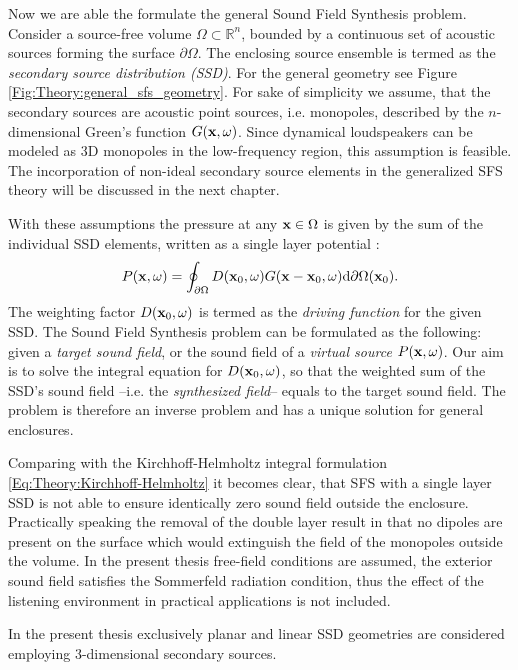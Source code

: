 Now we are able the formulate the general Sound Field Synthesis problem. Consider a source-free volume $\Omega \subset \mathbb{R}^n$, bounded by a continuous set of acoustic sources forming the surface $\partial \Omega$.
The enclosing source ensemble is termed as the \emph{secondary source distribution (SSD)}.
For the general geometry see Figure \ref{Fig:Theory:general_sfs_geometry}.
For sake of simplicity we assume, that the secondary sources are acoustic point sources, i.e. monopoles, described by the $n$-dimensional Green's function $G(\mathbf{x},\omega)$. Since dynamical loudspeakers can be modeled as 3D monopoles in the low-frequency region, this assumption is feasible. The incorporation of non-ideal secondary source elements in the generalized SFS theory will be discussed in the next chapter.

With these assumptions the pressure at any $\mathbf{x} \in \Omega$ is given by the sum of the individual SSD elements, written as a single layer potential \cite{Ahrens2012,Ahrens2010phd,Wierstorf2014,Schultz2014:Comparing_approaches}:
\begin{equation}
P(\mathbf{x},\omega) = \oint_{\partial \Omega} D(\mathbf{x}_0,\omega) G(\mathbf{x} - \mathbf{x}_0 , \omega ) \mathrm{d} \partial \Omega ( \mathbf{x}_0 ).
\label{Eq:Theory:3D_SFS}
\end{equation}
The weighting factor $D(\mathbf{x}_0,\omega)$ is termed as the \emph{driving function} for the given SSD. 
The Sound Field Synthesis problem can be formulated as the following: given a \emph{target sound field}, or the sound field of a \emph{virtual source} $P(\mathbf{x},\omega)$. Our aim is to solve the integral equation for $D(\mathbf{x}_0,\omega)$, so that the weighted sum of the SSD's sound field --i.e. the \emph{synthesized field}-- equals to the target sound field. 
The problem is therefore an inverse problem and has a unique solution for general enclosures.

Comparing with the Kirchhoff-Helmholtz integral formulation \eqref{Eq:Theory:Kirchhoff-Helmholtz} it becomes clear, that SFS with a single layer SSD is not able to ensure identically zero sound field outside the enclosure. Practically speaking the removal of the double layer result in that no dipoles are present on the surface which would extinguish the field of the monopoles outside the volume.
In the present thesis free-field conditions are assumed, the exterior sound field satisfies the Sommerfeld radiation condition, thus the effect of the listening environment in practical applications is not included.

In the present thesis exclusively planar and linear SSD geometries are considered employing 3-dimensional secondary sources.


